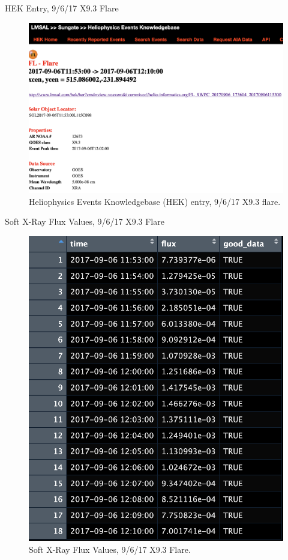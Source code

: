\documentclass{beamer}
\begin{document}
\begin{frame}{HEK Entry, 9/6/17 X9.3 Flare}
    \begin{figure}
        \centering
        \includegraphics[scale=0.3]{hek_entry.png}
        \caption{Heliophysics Events Knowledgebase (HEK) entry, 9/6/17 X9.3 flare.}
        \label{fig:hek_entry}
    \end{figure}
\end{frame}

\begin{frame}{Soft X-Ray Flux Values, 9/6/17 X9.3 Flare}
    \begin{figure}
        \centering
        \includegraphics[scale=0.4]{flux_vals_20170906.png}
        \caption{Soft X-Ray Flux Values, 9/6/17 X9.3 Flare.}
        \label{fig:flux_vals_20170906}
    \end{figure}
\end{frame}
\end{document}
